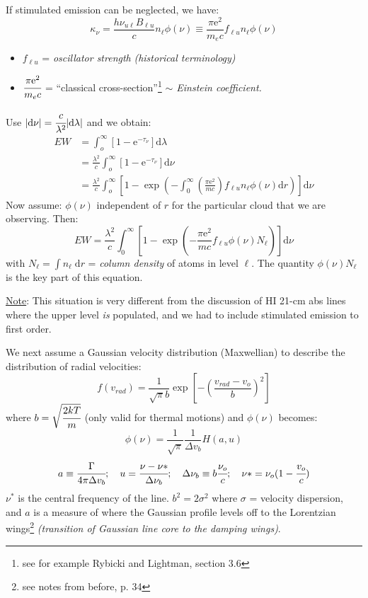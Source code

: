 \documentclass[11pt]{article}
\newcommand{\mar}[1]{\hspace{0pt}\marginpar{-\textcolor{black}{#1}-}}
\newcommand{\mynotes}[1]{{\fontfamily{cmss}\selectfont \textit{#1}}}
\begin{document}
If stimulated emission can be neglected, we have:
\[
    \kappa_{\nu} = \frac{h\nu_{u\ell}B_{\ell{u}}}{c}n_{\ell}\phi(\nu) \equiv
    \frac{\pi\mathrm{e}^{2}}{m_{e}c}f_{\ell{u}}n_{\ell}\phi(\nu)
    \]
\begin{itemize}
    \item $f_{\ell{u}}$ = \emph{oscillator strength}
        \mynotes{(historical terminology)}
    \item $\cfrac{\pi\mathrm{e}^{2}}{m_{e}c}$
        = ``classical cross-section''\footnote{
            see for example Rybicki and Lightman, section 3.6}
        \mynotes{$\sim$ Einstein coefficient.}
\end{itemize}

Use
$\vert\mathrm{d}\nu\vert = \cfrac{c}{\lambda^{2}}\vert\mathrm{d}{\lambda}\vert$
and we obtain:
\begin{align*}
    EW
    &= \int_{o}^{\infty}{
        \left[ 1 - \mathrm{e}^{-\tau_{\nu}} \right] \mathrm{d}\lambda}\\
    &= \frac{\lambda^{2}}{c}\int_{o}^{\infty}{
        \left[1-\mathrm{e}^{-\tau_{\nu}}\right]\mathrm{d}\nu} \\
    &= \frac{\lambda^{2}}{c}\int_{o}^{\infty}{
        \left[ 1 - \exp \left(
        -\int_{0}^{\infty}{
            \left( \frac{\pi\mathrm{e}^{2}}{mc} \right)
            f_{\ell{u}}n_{\ell}\phi(\nu)\mathrm{d}r} \right) \right] \mathrm{d}\nu }
\end{align*}
Now assume: $\phi(\nu)$ independent of $r$ for the particular cloud
that we are observing. Then:
$${
    EW = \frac{\lambda^{2}}{c}\int_{0}^{\infty}{
        \left[ 1 - \exp \left(
        -\frac{\pi\mathrm{e}^{2}}{mc}
        f_{\ell{u}} \phi (\nu) N_{\ell} \right) \right] \mathrm{d}\nu}
}$$
with $N_{\ell} = \int{n_{\ell}\;\mathrm{d}r}$ = \emph{column density}
of atoms in level $\ell$. The quantity $\phi(\nu)N_{\ell}$ is the key
part of this equation.

\mar{92}\underline{Note}: This situation is very different from the
discussion of HI 21-cm abs lines where the upper level \emph{is}
populated, and we had to include stimulated emission to first order.

We next assume a Gaussian velocity distribution (Maxwellian) to
describe the distribution of radial velocities:
\[
    f(v_{rad}) = \frac{1}{\sqrt{\pi}b}\exp  \left[
        - \left( \frac{v_{rad}-v_{o}}{b} \right) ^{2}\right]
    \]
where $b = \sqrt{\cfrac{2kT}{m}}$ (only valid for thermal motions)
and $\phi(\nu)$ becomes:
\[
    \phi(\nu) = \frac{1}{\sqrt{\pi}}\frac{1}{\Delta{v_{b}}}H(a,u)
    \]
\[
    a \equiv \cfrac{\Gamma}{4\pi\Delta{v_{b}}}; \quad
    u = \cfrac{\nu-\nu*}{\Delta\nu_{b}}; \quad
    \Delta\nu_{b} \equiv b\cfrac{\nu_{o}}{c}; \quad
    \nu* = \nu_{o}(1-\cfrac{v_{o}}{c})
    \]
$\nu^{*}$ is the central frequency of the line.
$b^{2} = 2\sigma^{2}$ where $\sigma$ = velocity dispersion, and $a$ is
a measure of where the Gaussian profile levels off to the Lorentzian
wings\footnote{see notes from before, p. 34}
\mynotes{(transition of Gaussian line core to the damping wings)}.
\end{document}
